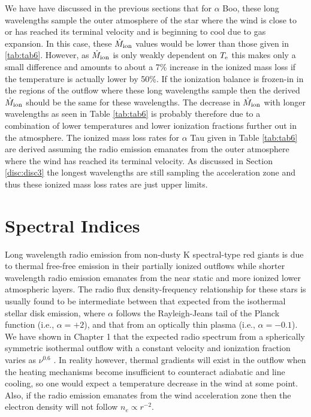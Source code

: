 We have have discussed in the previous sections that for $\alpha$ Boo, these long wavelengths sample the outer atmosphere of the star where the wind  is close to or has reached its terminal velocity and is beginning to cool due to gas expansion. In this case, these $\dot{M}_{\rm{ion}}$ values would be lower than those given in \ref{tab:tab6}. However, as $\dot{M}_{\rm{ion}}$  is only weakly dependent on $T_{\rm{e}}$ this makes only a small difference and amounts to about a 7\% increase in the ionized mass loss if the temperature is actually lower by 50\%. If the ionization balance is frozen-in in the regions of the outflow where these long wavelengths sample then the derived $\dot{M}_{\rm{ion}}$ should be the same  for these wavelengths. The decrease in $\dot{M}_{\rm{ion}}$ with longer wavelengths as seen in Table \ref{tab:tab6} is probably therefore due to a combination of lower temperatures and lower ionization fractions further out in the atmosphere. The ionized mass loss rates for $\alpha$ Tau given in Table \ref{tab:tab6} are derived assuming the radio emission emanates from the outer atmosphere where the wind has reached its terminal velocity. As discussed in Section \ref{disc:disc3} the longest wavelengths are still sampling the acceleration zone and thus these ionized mass loss rates are just upper limits.

\section{Spectral Indices}\label{sec:6.6}
Long wavelength radio emission from non-dusty K spectral-type red giants is due to thermal free-free emission in their partially ionized outflows while shorter wavelength radio emission emanates from the near static and more ionized lower atmospheric layers. The radio flux density-frequency relationship for these stars is usually found to be intermediate between that expected from the isothermal stellar disk emission, where $\alpha$ follows the Rayleigh-Jeans tail of the Planck function (i.e., $\alpha = +2$), and that from an optically thin plasma (i.e., $\alpha = -0.1$). We have shown in Chapter 1 that the expected radio spectrum from a spherically symmetric isothermal outflow with a constant velocity and ionization fraction varies as $\nu ^{0.6}$ \citep{wright_1975,olnon_1975,panagia_1975}. In reality however, thermal gradients will exist in the outflow when the heating mechanisms become insufficient to counteract adiabatic and line cooling, so one would expect a temperature decrease in the wind at some point. Also, if the radio emission emanates from the wind acceleration zone then the electron density will not follow $n_{e} \propto r^{-2}$. 

